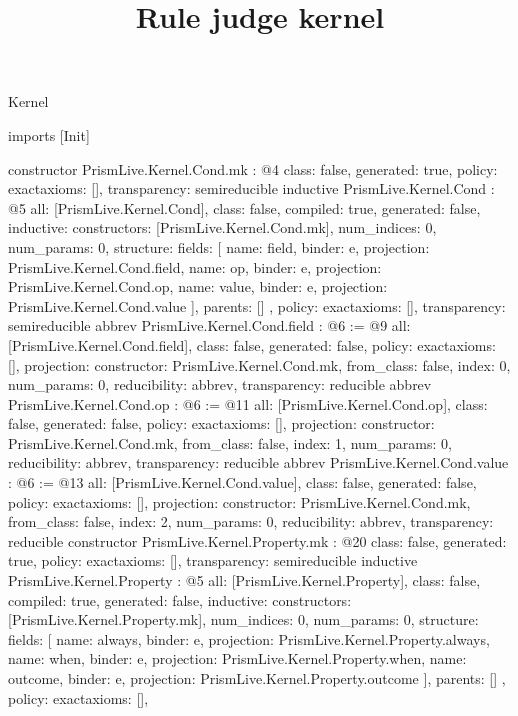 \begin{lexlean}{Kernel}
\title{Rule judge kernel}
\begin{coremodule}
imports [Init]

constructor PrismLive.Kernel.Cond.mk : @4 {
  class: false,
  generated: true,
  policy: exact{axioms: []},
  transparency: semireducible
}
inductive PrismLive.Kernel.Cond : @5 {
  all: [PrismLive.Kernel.Cond],
  class: false,
  compiled: true,
  generated: false,
  inductive: {
    constructors: [PrismLive.Kernel.Cond.mk],
    num_indices: 0,
    num_params: 0,
    structure: {
      fields: [
        {name: field, binder: e, projection: PrismLive.Kernel.Cond.field},
        {name: op, binder: e, projection: PrismLive.Kernel.Cond.op},
        {name: value, binder: e, projection: PrismLive.Kernel.Cond.value}
      ],
      parents: []
    }
  },
  policy: exact{axioms: []},
  transparency: semireducible
}
abbrev PrismLive.Kernel.Cond.field : @6 := @9 {
  all: [PrismLive.Kernel.Cond.field],
  class: false,
  generated: false,
  policy: exact{axioms: []},
  projection: {constructor: PrismLive.Kernel.Cond.mk, from_class: false, index: 0, num_params: 0},
  reducibility: abbrev{},
  transparency: reducible
}
abbrev PrismLive.Kernel.Cond.op : @6 := @11 {
  all: [PrismLive.Kernel.Cond.op],
  class: false,
  generated: false,
  policy: exact{axioms: []},
  projection: {constructor: PrismLive.Kernel.Cond.mk, from_class: false, index: 1, num_params: 0},
  reducibility: abbrev{},
  transparency: reducible
}
abbrev PrismLive.Kernel.Cond.value : @6 := @13 {
  all: [PrismLive.Kernel.Cond.value],
  class: false,
  generated: false,
  policy: exact{axioms: []},
  projection: {constructor: PrismLive.Kernel.Cond.mk, from_class: false, index: 2, num_params: 0},
  reducibility: abbrev{},
  transparency: reducible
}
constructor PrismLive.Kernel.Property.mk : @20 {
  class: false,
  generated: true,
  policy: exact{axioms: []},
  transparency: semireducible
}
inductive PrismLive.Kernel.Property : @5 {
  all: [PrismLive.Kernel.Property],
  class: false,
  compiled: true,
  generated: false,
  inductive: {
    constructors: [PrismLive.Kernel.Property.mk],
    num_indices: 0,
    num_params: 0,
    structure: {
      fields: [
        {name: always, binder: e, projection: PrismLive.Kernel.Property.always},
        {name: when, binder: e, projection: PrismLive.Kernel.Property.when},
        {name: outcome, binder: e, projection: PrismLive.Kernel.Property.outcome}
      ],
      parents: []
    }
  },
  policy: exact{axioms: []},
}
\end{coremodule}
\end{lexlean}
